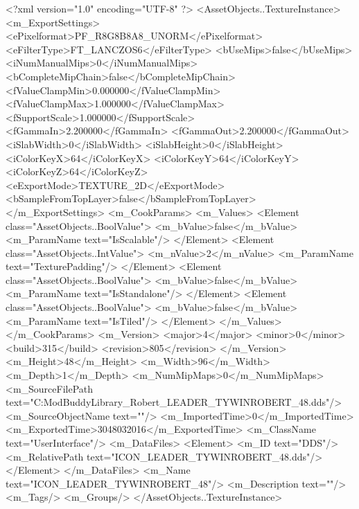 <?xml version="1.0" encoding="UTF-8" ?>
<AssetObjects..TextureInstance>
	<m_ExportSettings>
		<ePixelformat>PF_R8G8B8A8_UNORM</ePixelformat>
		<eFilterType>FT_LANCZOS6</eFilterType>
		<bUseMips>false</bUseMips>
		<iNumManualMips>0</iNumManualMips>
		<bCompleteMipChain>false</bCompleteMipChain>
		<fValueClampMin>0.000000</fValueClampMin>
		<fValueClampMax>1.000000</fValueClampMax>
		<fSupportScale>1.000000</fSupportScale>
		<fGammaIn>2.200000</fGammaIn>
		<fGammaOut>2.200000</fGammaOut>
		<iSlabWidth>0</iSlabWidth>
		<iSlabHeight>0</iSlabHeight>
		<iColorKeyX>64</iColorKeyX>
		<iColorKeyY>64</iColorKeyY>
		<iColorKeyZ>64</iColorKeyZ>
		<eExportMode>TEXTURE_2D</eExportMode>
		<bSampleFromTopLayer>false</bSampleFromTopLayer>
	</m_ExportSettings>
	<m_CookParams>
		<m_Values>
			<Element class="AssetObjects..BoolValue">
				<m_bValue>false</m_bValue>
				<m_ParamName text="IsScalable"/>
			</Element>
			<Element class="AssetObjects..IntValue">
				<m_nValue>2</m_nValue>
				<m_ParamName text="TexturePadding"/>
			</Element>
			<Element class="AssetObjects..BoolValue">
				<m_bValue>false</m_bValue>
				<m_ParamName text="IsStandalone"/>
			</Element>
			<Element class="AssetObjects..BoolValue">
				<m_bValue>false</m_bValue>
				<m_ParamName text="IsTiled"/>
			</Element>
		</m_Values>
	</m_CookParams>
	<m_Version>
		<major>4</major>
		<minor>0</minor>
		<build>315</build>
		<revision>805</revision>
	</m_Version>
	<m_Height>48</m_Height>
	<m_Width>96</m_Width>
	<m_Depth>1</m_Depth>
	<m_NumMipMaps>0</m_NumMipMaps>
	<m_SourceFilePath text="C:\Users\Furion\Documents\Firaxis ModBuddy\ArtDef Library\Tywin_Robert\ICON_LEADER_TYWINROBERT_48.dds"/>
	<m_SourceObjectName text=""/>
	<m_ImportedTime>0</m_ImportedTime>
	<m_ExportedTime>3048032016</m_ExportedTime>
	<m_ClassName text="UserInterface"/>
	<m_DataFiles>
		<Element>
			<m_ID text="DDS"/>
			<m_RelativePath text="ICON_LEADER_TYWINROBERT_48.dds"/>
		</Element>
	</m_DataFiles>
	<m_Name text="ICON_LEADER_TYWINROBERT_48"/>
	<m_Description text=""/>
	<m_Tags/>
	<m_Groups/>
</AssetObjects..TextureInstance>

